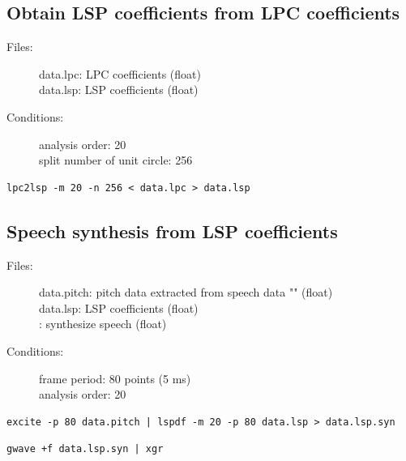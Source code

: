 \documentclass[a4paper,10pt]{article}
\begin{document}
\subsection{Obtain LSP coefficients from LPC coefficients}
\begin{description}
\item[Files:]
   data.lpc: LPC coefficients (float)\\
   data.lsp: LSP coefficients (float)
\item[Conditions:]
  analysis order: 20\\
  split number of unit circle: 256
\end{description}

\begin{verbatim}
lpc2lsp -m 20 -n 256 < data.lpc > data.lsp
\end{verbatim}

\subsection{Speech synthesis from LSP coefficients}

\begin{description}
\item[Files:]
  data.pitch: pitch data extracted from speech data
           ""
           (float)\\
  data.lsp: LSP coefficients (float)\\
  :
  synthesize speech (float)
\item[Conditions:]
  frame period: 80 points (5 ms)\\
  analysis order: 20
\end{description}

\begin{verbatim}
excite -p 80 data.pitch | lspdf -m 20 -p 80 data.lsp > data.lsp.syn
\end{verbatim}

\begin{verbatim}
gwave +f data.lsp.syn | xgr
\end{verbatim}
\end{document}
